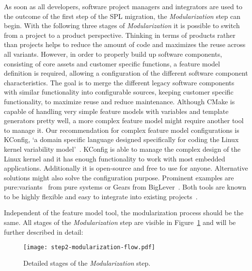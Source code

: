 As soon as all developers, software project managers and integrators are used to
the outcome of the first step of the SPL migration, the \textit{Modularization}
step can begin. With the following three stages of \textit{Modularization} it is
possible to switch from a project to a product perspective. Thinking in terms of
products rather than projects helps to reduce the amount of code and maximizes
the reuse across all variants. However, in order to properly build up software
components, consisting of core assets and customer specific functions, a feature
model definition is required, allowing a configuration of the different software
component characteristics. The goal is to merge the different legacy software
components with similar functionality into configurable sources, keeping
customer specific functionality, to maximize reuse and reduce maintenance.
Although CMake is capable of handling very simple feature models with variables
and template generators pretty well, a more complex feature model might require
another tool to manage it. Our recommendation for complex feature model
configurations is KConfig, `a domain specific language designed specifically for
coding the Linux kernel variability model'~\cite[page 3]{kconfigKernel}. KConfig
is able to manage the complex design of the Linux kernel and it has enough
functionality to work with most embedded applications. Additionally it is
open-source and free to use for anyone. Alternative solutions might also solve
the configuration purpose. Prominent examples are
pure:variants~\cite{pureVariantsPureSystems} from pure systems or Gears from
BigLever~\cite{gearsBigLever}. Both tools are known to be highly flexible and
easy to integrate into existing projects~\cite{incrementalPLE}.

Independent of the feature model tool, the modularization process should be the same.
All stages of the \textit{Modularization} step are visible in
Figure~\ref{fig:step2Modularization} and will be further described in detail:

\begin{figure}
  \centering
  \texttt{[image: step2-modularization-flow.pdf]}
  \caption{Detailed stages of the \textit{Modularization} step.}
  \label{fig:step2Modularization}
\end{figure}

